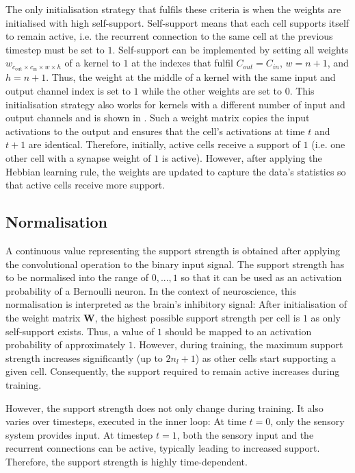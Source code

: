 The only initialisation strategy that fulfils these criteria is when the weights are initialised with high self-support.
Self-support means that each cell supports itself to remain active, i.e. the recurrent connection to the same cell at the previous timestep must be set to $1$.
Self-support can be implemented by setting all weights $w_{c_{\text{out}} \times c_{\text{in}} \times w \times h}$ of a kernel to $1$ at the indexes that fulfil 
$C_{out} = C_{in}$, $w = n+1$, and $h = n+1$. Thus, the weight at the middle of a kernel with the same input and output channel index is set to $1$ while the other weights are set to $0$. This initialisation strategy also works for kernels with a different number of input and output channels and is shown in .
Such a weight matrix copies the input activations to the output and ensures that the cell's activations at time $t$ and $t+1$ are identical. Therefore, initially, active cells receive a support of $1$ (i.e. one other cell with a synapse weight of $1$ is active).
However, after applying the Hebbian learning rule, the weights are updated to capture the data's statistics so that active cells receive more support.

\subsection{Normalisation}
A continuous value representing the support strength is obtained after applying the convolutional operation to the binary input signal.
The support strength has to be normalised into the range of $0, ..., 1$ so that it can be used as an activation probability of a Bernoulli neuron.
In the context of neuroscience, this normalisation is interpreted as the brain's inhibitory signal:
After initialisation of the weight matrix $\boldsymbol{W}$, the highest possible support strength per cell is $1$ as only self-support exists. Thus, a value of $1$ should be mapped to an activation probability of approximately $1$. However, during training, the maximum support strength increases significantly (up to $2n_l + 1$) as other cells start supporting a given cell.
Consequently, the support required to remain active increases during training.

However, the support strength does not only change during training. It also varies over timesteps, executed in the inner loop: At time $t=0$, only the sensory system provides input. At timestep $t=1$, both the sensory input and the recurrent connections can be active, typically leading to increased support. Therefore, the support strength is highly time-dependent.

